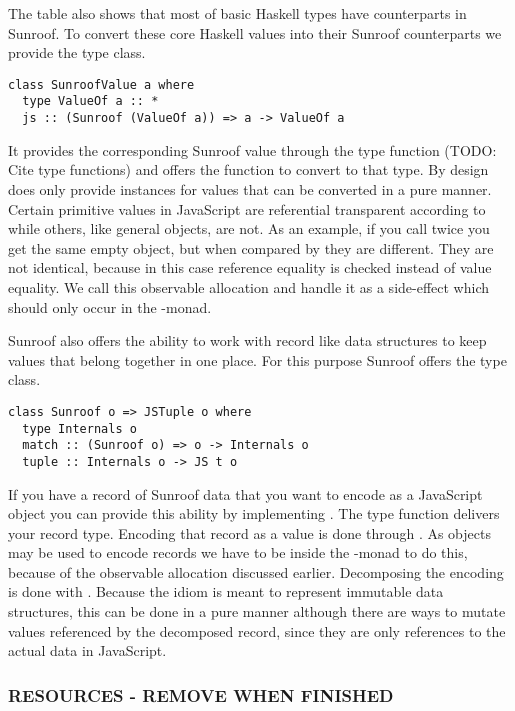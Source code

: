 The table also shows that most of basic Haskell types have counterparts in
Sunroof. To convert these core Haskell values into their Sunroof 
counterparts we provide the  type class.
\begin{verbatim}
class SunroofValue a where
  type ValueOf a :: *
  js :: (Sunroof (ValueOf a)) => a -> ValueOf a
\end{verbatim}
It provides the corresponding Sunroof value through the type function
 (TODO: Cite type functions) and offers the function 
 to convert to that type. By design  does
only provide instances for values that can be converted in a pure
manner. Certain primitive values in JavaScript are referential 
transparent according to \Src{==} while others, like general objects,
are not. As an example, if you call  twice you get the 
same empty object, but when compared by \Src{==} they are different. They
are not identical, because in this case reference equality is checked
instead of value equality. We call this observable allocation and handle 
it as a side-effect which should only occur in the \JS-monad.

Sunroof also offers the ability to work with record like data structures to 
keep values that belong together in one place.
For this purpose Sunroof offers the  type class.
\begin{verbatim}
class Sunroof o => JSTuple o where
  type Internals o
  match :: (Sunroof o) => o -> Internals o
  tuple :: Internals o -> JS t o
\end{verbatim}
If you have a record of Sunroof data that you want to
encode as a JavaScript object you can provide this ability 
by implementing . The  type function
delivers your record type. Encoding that record as a 
value is done through . As objects may be used to 
encode records we have to be inside the \JS-monad to do this,
because of the observable allocation discussed earlier.
Decomposing the encoding is done with . Because the
 idiom is meant to represent immutable data structures, this 
can be done in a pure manner although there are ways to mutate 
values referenced by the decomposed record, since they are only 
references to the actual data in JavaScript.

\subsubsection{RESOURCES - REMOVE WHEN FINISHED}

